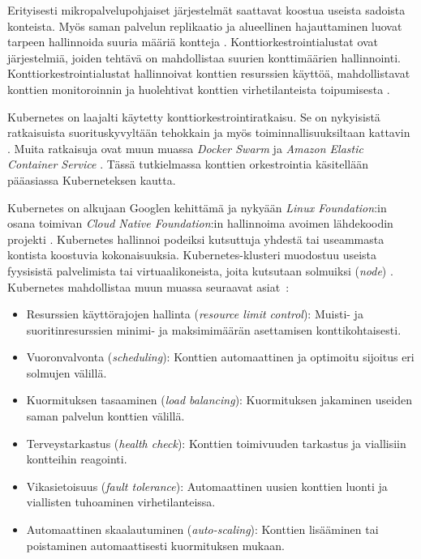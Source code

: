 Erityisesti mikropalvelupohjaiset järjestelmät saattavat koostua useista sadoista konteista.
Myös saman palvelun replikaatio ja alueellinen hajauttaminen luovat tarpeen hallinnoida suuria määriä kontteja \cite{Khan17}.
Konttiorkestrointialustat ovat järjestelmiä, joiden tehtävä on mahdollistaa suurien konttimäärien hallinnointi.
Konttiorkestrointialustat hallinnoivat konttien resurssien käyttöä, mahdollistavat konttien monitoroinnin ja huolehtivat konttien virhetilanteista toipumisesta \cite{Zhou21}.

Kubernetes on laajalti käytetty konttiorkestrointiratkaisu.
Se on nykyisistä ratkaisuista suorituskyvyltään tehokkain ja myös toiminnallisuuksiltaan kattavin \cite{Jawarneh19}.
Muita ratkaisuja ovat muun muassa \textit{Docker Swarm} ja \textit{Amazon Elastic Container Service} \cite{Khan17}.
Tässä tutkielmassa konttien orkestrointia käsitellään pääasiassa Kuberneteksen kautta.

Kubernetes on alkujaan Googlen kehittämä ja nykyään \textit{Linux Foundation}:in osana toimivan \textit{Cloud Native Foundation}:in hallinnoima avoimen lähdekoodin projekti \cite{Burns22}.
Kubernetes hallinnoi podeiksi kutsuttuja yhdestä tai useammasta kontista koostuvia kokonaisuuksia.
Kubernetes-klusteri muodostuu useista fyysisistä palvelimista tai virtuaalikoneista, joita kutsutaan solmuiksi (\textit{node}) \cite{Medel18}.
Kubernetes mahdollistaa muun muassa seuraavat asiat~\cite{Zhou21}:

\begin{itemize}
\item Resurssien käyttörajojen hallinta (\textit{resource limit control}): Muisti- ja suoritinresurssien minimi- ja maksimimäärän asettamisen konttikohtaisesti.
\item Vuoronvalvonta (\textit{scheduling}): Konttien automaattinen ja optimoitu sijoitus eri solmujen välillä.
\item Kuormituksen tasaaminen (\textit{load balancing}): Kuormituksen jakaminen useiden saman palvelun konttien välillä. 
\item Terveystarkastus (\textit{health check}): Konttien toimivuuden tarkastus ja viallisiin kontteihin reagointi.
\item Vikasietoisuus (\textit{fault tolerance}): Automaattinen uusien konttien luonti ja viallisten tuhoaminen virhetilanteissa.
\item Automaattinen skaalautuminen (\textit{auto-scaling}): Konttien lisääminen tai poistaminen automaattisesti kuormituksen mukaan.
\end{itemize}

